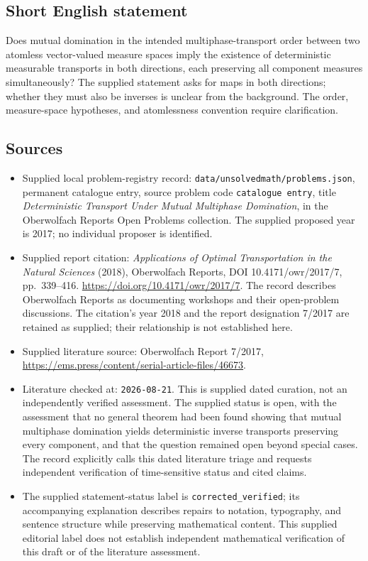 \documentclass[11pt]{article}
\begin{document}
\subsection{Short English statement}
Does mutual domination in the intended multiphase-transport order between two atomless vector-valued measure spaces imply the existence of deterministic measurable transports in both directions, each preserving all component measures simultaneously? The supplied statement asks for maps in both directions; whether they must also be inverses is unclear from the background. The order, measure-space hypotheses, and atomlessness convention require clarification.
\subsection{Sources}
\begin{itemize}
\item Supplied local problem-registry record: \texttt{data/unsolvedmath/problems.json}, permanent catalogue entry, source problem code \texttt{catalogue entry}, title \emph{Deterministic Transport Under Mutual Multiphase Domination}, in the Oberwolfach Reports Open Problems collection. The supplied proposed year is 2017; no individual proposer is identified.
\item Supplied report citation: \emph{Applications of Optimal Transportation in the Natural Sciences} (2018), Oberwolfach Reports, DOI 10.4171/owr/2017/7, pp.~339--416. \url{https://doi.org/10.4171/owr/2017/7}. The record describes Oberwolfach Reports as documenting workshops and their open-problem discussions. The citation's year 2018 and the report designation 7/2017 are retained as supplied; their relationship is not established here.
\item Supplied literature source: Oberwolfach Report 7/2017, \url{https://ems.press/content/serial-article-files/46673}.
\item Literature checked at: \texttt{2026-08-21}. This is supplied dated curation, not an independently verified assessment. The supplied status is open, with the assessment that no general theorem had been found showing that mutual multiphase domination yields deterministic inverse transports preserving every component, and that the question remained open beyond special cases. The record explicitly calls this dated literature triage and requests independent verification of time-sensitive status and cited claims.
\item The supplied statement-status label is \texttt{corrected\_verified}; its accompanying explanation describes repairs to notation, typography, and sentence structure while preserving mathematical content. This supplied editorial label does not establish independent mathematical verification of this draft or of the literature assessment.
\end{itemize}
\end{document}
